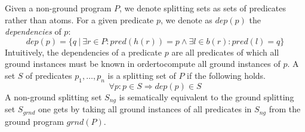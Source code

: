 \begin{definition}
\label{def:prelims-asp-semantics-nonground-splitting-set}
Given a non-ground program $P$, we denote splitting sets as sets of predicates rather than atoms. 
For a given predicate $p$, we denote as $dep(p)$ the \emph{dependencies} of $p$:
 \[
	dep(p) = \{q~|~\exists r \in P: pred(h(r)) = p \land \exists l \in b(r): pred(l) = q\}
\]
Intuitively, the dependencies of a predicate $p$ are all predicates of which all ground instances must be known in ordertocompute all ground instances of $p$.
A set $S$ of predicates $p_1,\ldots,p_n$ is a splitting set of $P$ if the following holds. 
\[
	\forall p:  p \in S \Rightarrow dep(p) \in S
\]
A non-ground splitting set $S_{ng}$ is sematically equivalent to the ground splitting set $S_{grnd}$ one gets by taking all ground instances of all predicates in $S_{ng}$ from the ground program $grnd(P)$.
\end{definition}

